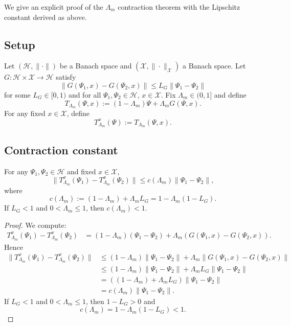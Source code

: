 \documentclass[11pt]{article}
\begin{document}
We give an explicit proof of the $\Lambda_m$ contraction theorem with the Lipschitz constant derived as above.

\subsection{Setup}

Let $(\mathcal{H},\|\cdot\|)$ be a Banach space and $(\mathcal{X},\|\cdot\|_{\mathcal{X}})$ a Banach space. Let $G : \mathcal{H} \times \mathcal{X} \to \mathcal{H}$ satisfy
\begin{equation}\label{eq:Lip_G_app}
  \|G(\Psi_1,x) - G(\Psi_2,x)\|
  \leq
  L_G \|\Psi_1 - \Psi_2\|
\end{equation}
for some $L_G \in [0,1)$ and for all $\Psi_1,\Psi_2 \in \mathcal{H}$, $x \in \mathcal{X}$. Fix $\Lambda_m \in (0,1]$ and define
\begin{equation}
  T_{\Lambda_m}(\Psi,x)
  :=
  (1 - \Lambda_m)\Psi + \Lambda_m G(\Psi,x).
\end{equation}
For any fixed $x \in \mathcal{X}$, define
\[
  T_{\Lambda_m}^x(\Psi) := T_{\Lambda_m}(\Psi,x).
\]

\subsection{Contraction constant}

\begin{lemma}
For any $\Psi_1,\Psi_2 \in \mathcal{H}$ and fixed $x \in \mathcal{X}$,
\begin{equation}
  \|T_{\Lambda_m}^x(\Psi_1) - T_{\Lambda_m}^x(\Psi_2)\|
  \leq
  c(\Lambda_m) \|\Psi_1 - \Psi_2\|,
\end{equation}
where
\begin{equation}
  c(\Lambda_m) := (1 - \Lambda_m) + \Lambda_m L_G
  = 1 - \Lambda_m(1 - L_G).
\end{equation}
If $L_G < 1$ and $0 < \Lambda_m \leq 1$, then $c(\Lambda_m) < 1$.
\end{lemma}

\begin{proof}
We compute:
\begin{align*}
  T_{\Lambda_m}^x(\Psi_1) - T_{\Lambda_m}^x(\Psi_2)
  &=
  (1 - \Lambda_m)(\Psi_1 - \Psi_2)
  + \Lambda_m (G(\Psi_1,x) - G(\Psi_2,x)).
\end{align*}
Hence
\begin{align*}
  \|T_{\Lambda_m}^x(\Psi_1) - T_{\Lambda_m}^x(\Psi_2)\|
  &\leq
  (1 - \Lambda_m) \|\Psi_1 - \Psi_2\|
  + \Lambda_m \|G(\Psi_1,x) - G(\Psi_2,x)\| \\
  &\leq
  (1 - \Lambda_m) \|\Psi_1 - \Psi_2\|
  + \Lambda_m L_G \|\Psi_1 - \Psi_2\| \\
  &=
  \left( (1 - \Lambda_m) + \Lambda_m L_G \right)
  \|\Psi_1 - \Psi_2\| \\
  &=
  c(\Lambda_m) \|\Psi_1 - \Psi_2\|.
\end{align*}
If $L_G < 1$ and $0 < \Lambda_m \leq 1$, then $1 - L_G > 0$ and
\[
  c(\Lambda_m) = 1 - \Lambda_m(1 - L_G) < 1.
\]
\end{proof}
\end{document}
